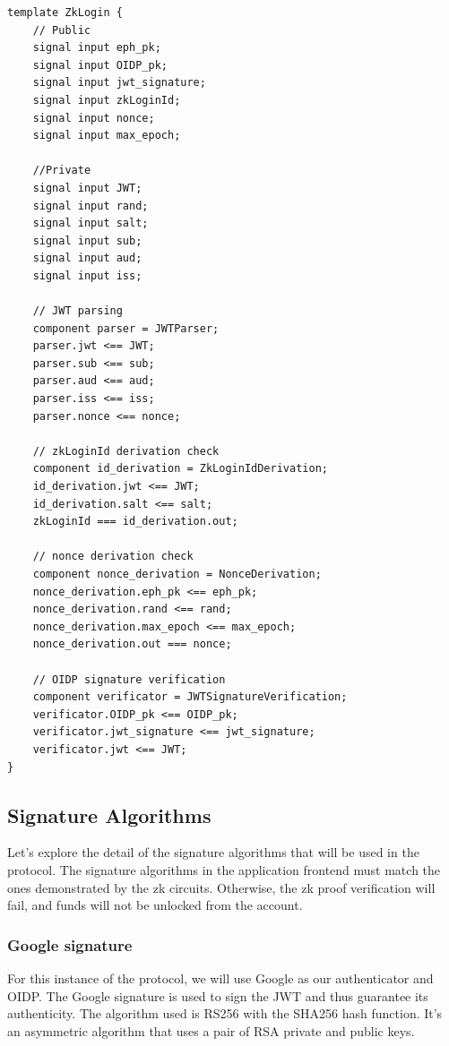 \documentclass{article}
\begin{document}
\begin{lstlisting}[caption={Circom circuit overview}, label={lst:circom}]
template ZkLogin {
    // Public
    signal input eph_pk;
    signal input OIDP_pk;
    signal input jwt_signature;
    signal input zkLoginId;
    signal input nonce;
    signal input max_epoch;

    //Private
    signal input JWT;
    signal input rand;
    signal input salt;
    signal input sub;
    signal input aud;
    signal input iss;

    // JWT parsing
    component parser = JWTParser;
    parser.jwt <== JWT;
    parser.sub <== sub;
    parser.aud <== aud;
    parser.iss <== iss;
    parser.nonce <== nonce;

    // zkLoginId derivation check
    component id_derivation = ZkLoginIdDerivation;
    id_derivation.jwt <== JWT;
    id_derivation.salt <== salt;
    zkLoginId === id_derivation.out;

    // nonce derivation check
    component nonce_derivation = NonceDerivation;
    nonce_derivation.eph_pk <== eph_pk;
    nonce_derivation.rand <== rand;
    nonce_derivation.max_epoch <== max_epoch;
    nonce_derivation.out === nonce;

    // OIDP signature verification
    component verificator = JWTSignatureVerification;
    verificator.OIDP_pk <== OIDP_pk;
    verificator.jwt_signature <== jwt_signature;
    verificator.jwt <== JWT;
}
\end{lstlisting}

\subsection{Signature Algorithms}
Let's explore the detail of the signature algorithms that will be used in the protocol.
The signature algorithms in the application frontend must match the ones demonstrated by the zk circuits.
Otherwise, the zk proof verification will fail, and funds will not be unlocked from the account.

\subsubsection{Google signature}
For this instance of the protocol, we will use Google as our authenticator and OIDP.
The Google signature is used to sign the JWT and thus guarantee its authenticity.
The algorithm used is RS256 with the SHA256 hash function.
It's an asymmetric algorithm that uses a pair of RSA private and public keys.
\end{document}
